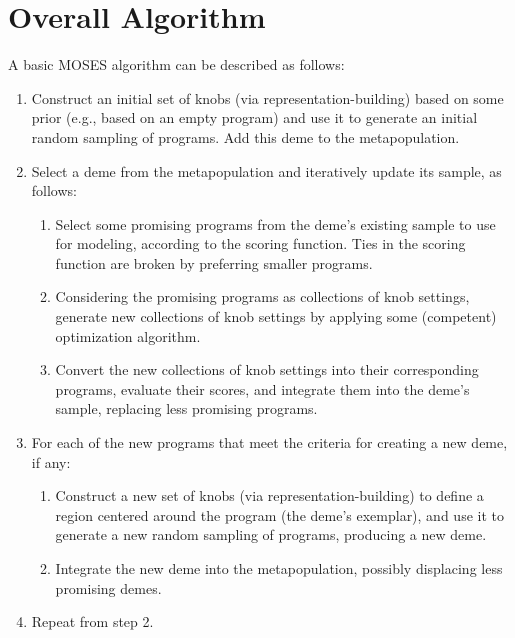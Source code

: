\documentclass{article}
\begin{document}
\section{Overall Algorithm}

A basic MOSES algorithm can be described as follows:

\begin{enumerate}
\item Construct an initial set of knobs (via representation-building) based on 
some prior (e.g., based on an empty program) and use it to generate an initial 
random sampling of programs. Add this deme to the metapopulation.

\item Select a deme from the metapopulation and iteratively update its sample, as follows:

\begin{enumerate}
\item   Select some promising programs from the deme’s existing sample to use for 
        modeling, according to the scoring function. Ties in the scoring function are broken
        by preferring smaller programs.

\item   Considering the promising programs as collections of knob settings, generate
        new collections of knob settings by applying some (competent) optimization algorithm.

\item   Convert the new collections of knob settings into their corresponding programs,
        evaluate their scores, and integrate them into the deme’s sample, replacing less
        promising programs.
\end{enumerate}

\item  For each of the new programs that meet the criteria for creating a new deme, if any:

\begin{enumerate}
\item   Construct a new set of knobs (via representation-building) to define a region
        centered around the program (the deme’s exemplar), and use it to generate a
        new random sampling of programs, producing a new deme.

\item   Integrate the new deme into the metapopulation, possibly displacing less 
        promising demes.
\end{enumerate}

\item Repeat from step 2.
\end{enumerate}
\end{document}

